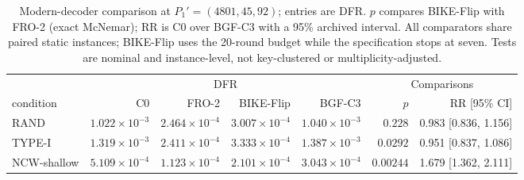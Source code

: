 \begin{table}[!t]
\centering
\small
\caption{Modern-decoder comparison at $P_1'=(4801,45,92)$; entries are DFR. $p$ compares BIKE-Flip with FRO-2 (exact McNemar); RR is C0 over BGF-C3 with a 95\% archived interval. All comparators share paired static instances; BIKE-Flip uses the 20-round budget while the specification stops at seven. Tests are nominal and instance-level, not key-clustered or multiplicity-adjusted.}
\label{tab:modern}
\begin{tabular}{lrrrrrr}
\toprule
 & \multicolumn{4}{c}{DFR} & \multicolumn{2}{c}{Comparisons} \\
\cmidrule(lr){2-5} \cmidrule(lr){6-7}
condition & C0 & FRO-2 & BIKE-Flip & BGF-C3 & $p$ & RR [95\% CI] \\
\midrule
RAND & $1.022\times10^{-3}$ & $2.464\times10^{-4}$ & $3.007\times10^{-4}$ & $1.040\times10^{-3}$ & $0.228$ & 0.983 [0.836, 1.156] \\
TYPE-I & $1.319\times10^{-3}$ & $2.411\times10^{-4}$ & $3.333\times10^{-4}$ & $1.387\times10^{-3}$ & $0.0292$ & 0.951 [0.837, 1.086] \\
NCW-shallow & $5.109\times10^{-4}$ & $1.123\times10^{-4}$ & $2.101\times10^{-4}$ & $3.043\times10^{-4}$ & $0.00244$ & 1.679 [1.362, 2.111] \\
\bottomrule
\end{tabular}
\end{table}
